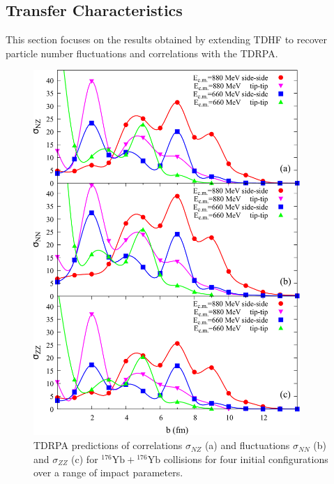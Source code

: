 \subsection{Transfer Characteristics}\label{sec:tran}

This section focuses on the results obtained by extending TDHF to recover particle number fluctuations and correlations with the TDRPA.

\begin{figure}
	\centering
	\includegraphics*[width=0.9\textwidth]{../Figures/YbYb/Fluctuations.pdf}
	\caption{TDRPA predictions of correlations $\sigma_{NZ}$ (a) and fluctuations $\sigma_{NN}$ (b) and $\sigma_{ZZ}$ (c) for $^{176}\mathrm{Yb}+{}^{176}\mathrm{Yb}$ collisions for four initial configurations over a range of impact parameters.}
	\label{fig:fluc}
\end{figure}

